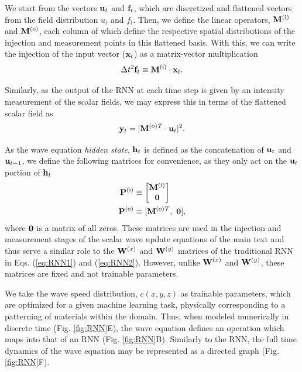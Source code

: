 We start from the vectors $\mathbf{u}_t$ and $\mathbf{f}_t$, which are discretized and flattened vectors from the field distribution $u_t$ and $f_t$.
Then, we define the linear operators, $\mathbf{M}^{(\textrm{i})}$ and $\mathbf{M}^{(\textrm{o})}$, each column of which define the respective spatial distributions of the injection and measurement points in this flattened basis.
With this, we can write the injection of the input vector ($\mathbf{x}_t$) as a matrix-vector multiplication
%
\begin{equation}
    \Delta t^2 \mathbf{f}_t \equiv \mathbf{M}^{(\textrm{i})} \cdot \mathbf{x}_t.
\end{equation}

Similarly, as the output of the RNN at each time step is given by an intensity measurement of the scalar fields, we may express this in terms of the flattened scalar field as
\begin{equation}
    \mathbf{y}_t = |\mathbf{M}^{(\textrm{o})}{}^T \cdot \mathbf{u}_t|^2.
\end{equation}

As the wave equation \textit{hidden state}, $\mathbf{h}_t$ is defined as the concatenation of $\mathbf{u}_t$ and $\mathbf{u}_{t-1}$, we define the following matrices for convenience, as they only act on the $\mathbf{u}_t$ portion of $\mathbf{h}_t$
\begin{align}
    \mathbf{P}^{(\textrm{i})} &\equiv \begin{bmatrix} \mathbf{M}^{(\textrm{i})} \\ \mathbf{0} \end{bmatrix} \\ 
    \mathbf{P}^{(\textrm{o})} &\equiv [\mathbf{M}^{(\textrm{o})}{}^T,~\mathbf{0}],
\end{align}
where $\mathbf{0}$ is a matrix of all zeros.
These matrices are used in the injection and measurement stages of the scalar wave update equations of the main text and thus serve a similar role to the $\mathbf{W}^{(x)}$ and $\mathbf{W}^{(y)}$ matrices of the traditional RNN in Eqs. (\ref{eq:RNN1}) and (\ref{eq:RNN2}).  However, unlike $\mathbf{W}^{(x)}$ and $\mathbf{W}^{(y)}$, these matrices are fixed and not trainable parameters.

We take the wave speed distribution, $c{\left(x,y,z\right)}$ as trainable parameters, which are optimized for a given machine learning task, physically corresponding to a patterning of materials within the domain.
Thus, when modeled numerically in discrete time (Fig. \ref{fig:RNN}E), the wave equation defines an operation which maps into that of an RNN (Fig. \ref{fig:RNN}B).
Similarly to the RNN, the full time dynamics of the wave equation may be represented as a directed graph (Fig. \ref{fig:RNN}F).

